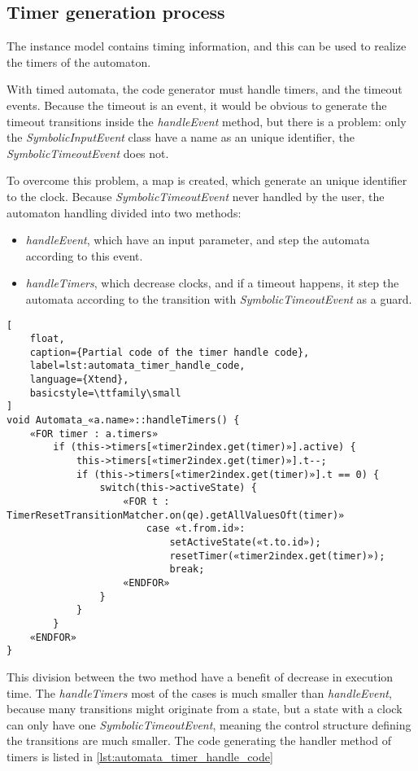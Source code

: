 \subsection{Timer generation process}

The instance model contains timing information, and this can be used to realize the timers of the automaton.

With timed automata, the code generator must handle timers, and the timeout events. Because the timeout is an event, it would be obvious to generate the timeout transitions inside the \emph{handleEvent} method, but there is a problem: only the \emph{SymbolicInputEvent} class have a name as an unique identifier, the \emph{SymbolicTimeoutEvent} does not.

To overcome this problem, a map is created, which generate an unique identifier to the clock. Because \emph{SymbolicTimeoutEvent} never handled by the user, the automaton handling divided into two methods:
\begin{itemize}
	\item \emph{handleEvent}, which have an input parameter, and step the automata according to this event.
	\item \emph{handleTimers}, which decrease clocks, and if a timeout happens, it step the automata according to the transition with \emph{SymbolicTimeoutEvent} as a guard.
\end{itemize}

\begin{lstlisting}[
	float,
	caption={Partial code of the timer handle code},
	label=lst:automata_timer_handle_code,
	language={Xtend},
	basicstyle=\ttfamily\small
]
void Automata_«a.name»::handleTimers() {
	«FOR timer : a.timers»
		if (this->timers[«timer2index.get(timer)»].active) {
			this->timers[«timer2index.get(timer)»].t--;
			if (this->timers[«timer2index.get(timer)»].t == 0) {
				switch(this->activeState) {
					«FOR t : TimerResetTransitionMatcher.on(qe).getAllValuesOft(timer)»
						case «t.from.id»:
							setActiveState(«t.to.id»);
							resetTimer(«timer2index.get(timer)»);
							break;
					«ENDFOR»
				}
			}
		}
	«ENDFOR»
}
\end{lstlisting}


This division between the two method have a benefit of decrease in execution time. The \emph{handleTimers} most of the cases is much smaller than \emph{handleEvent}, because many transitions might originate from a state, but a state with a clock can only have one \emph{SymbolicTimeoutEvent}, meaning the control structure defining the transitions are much smaller. The code generating the handler method of timers is listed in \cref{lst:automata_timer_handle_code}
